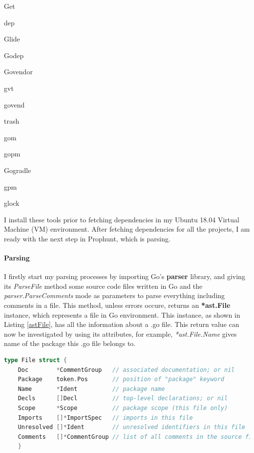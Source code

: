 \documentclass{seal_thesis}
\begin{document}
\begin{itemize*}[font={\color{red!50!black}}]
	\item Get 
	\item dep
	\item Glide
	\item Godep
	\item Govendor
	\item gvt
	\item govend
	\item trash
	\item gom
	\item gopm
	\item Gogradle
	\item gpm
	\item glock
\end{itemize*}

I install these tools prior to fetching dependencies in my Ubuntu 18.04 Virtual Machine (VM) environment. After fetching dependencies for all the projects, I am ready with the next step in Prophunt, which is parsing.

\paragraph{Parsing}

I firstly start my parsing processes by importing Go's \textbf{parser} library, and giving its \textit{ParseFile} method some source code files written in Go and the \textit{parser.ParseComments} mode as parameters to parse everything including comments in a file. This method, unless errors occure, returns an \textbf{*ast.File} instance, which represents a file in Go environment. This instance, as shown in Listing \ref{astFile}, has all the information about a .go file. This return value can now be investigated by using its attributes, for example, \textit{*ast.File.Name} gives name of the package this .go file belongs to.

\begin{lstlisting}[caption=*ast.File declaration in Go., label={astFile}, language=Go, frame=single]
	type File struct {
	Doc        *CommentGroup   // associated documentation; or nil
	Package    token.Pos       // position of "package" keyword
	Name       *Ident          // package name
	Decls      []Decl          // top-level declarations; or nil
	Scope      *Scope          // package scope (this file only)
	Imports    []*ImportSpec   // imports in this file
	Unresolved []*Ident        // unresolved identifiers in this file
	Comments   []*CommentGroup // list of all comments in the source file
	}
\end{lstlisting}
\end{document}
